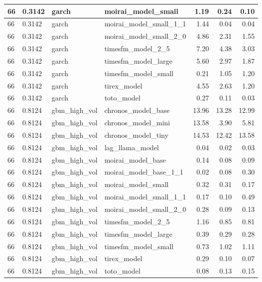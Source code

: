 {\begin{tabular}{llllrrr}
\midrule
66 & 0.3142 & garch & moirai\_model\_small & 1.19 & 0.24 & 0.10 \\
\midrule
66 & 0.3142 & garch & moirai\_model\_small\_1\_1 & 1.44 & 0.04 & 0.04 \\
\midrule
66 & 0.3142 & garch & moirai\_model\_small\_2\_0 & 4.86 & 2.31 & 1.55 \\
\midrule
66 & 0.3142 & garch & timesfm\_model\_2\_5 & 7.20 & 4.38 & 3.03 \\
\midrule
66 & 0.3142 & garch & timesfm\_model\_large & 5.60 & 2.97 & 1.87 \\
\midrule
66 & 0.3142 & garch & timesfm\_model\_small & 0.21 & 1.05 & 1.20 \\
\midrule
66 & 0.3142 & garch & tirex\_model & 4.55 & 2.63 & 1.20 \\
\midrule
66 & 0.3142 & garch & toto\_model & 0.27 & 0.11 & 0.03 \\
\midrule
66 & 0.8124 & gbm\_high\_vol & chronos\_model\_base & 13.96 & 13.28 & 12.99 \\
\midrule
66 & 0.8124 & gbm\_high\_vol & chronos\_model\_mini & 13.58 & 3.90 & 5.81 \\
\midrule
66 & 0.8124 & gbm\_high\_vol & chronos\_model\_tiny & 14.53 & 12.42 & 13.58 \\
\midrule
66 & 0.8124 & gbm\_high\_vol & lag\_llama\_model & 0.04 & 0.02 & 0.03 \\
\midrule
66 & 0.8124 & gbm\_high\_vol & moirai\_model\_base & 0.14 & 0.08 & 0.09 \\
\midrule
66 & 0.8124 & gbm\_high\_vol & moirai\_model\_base\_1\_1 & 0.02 & 0.08 & 0.30 \\
\midrule
66 & 0.8124 & gbm\_high\_vol & moirai\_model\_small & 0.32 & 0.31 & 0.17 \\
\midrule
66 & 0.8124 & gbm\_high\_vol & moirai\_model\_small\_1\_1 & 0.17 & 0.10 & 0.49 \\
\midrule
66 & 0.8124 & gbm\_high\_vol & moirai\_model\_small\_2\_0 & 0.28 & 0.09 & 0.13 \\
\midrule
66 & 0.8124 & gbm\_high\_vol & timesfm\_model\_2\_5 & 1.16 & 0.85 & 0.81 \\
\midrule
66 & 0.8124 & gbm\_high\_vol & timesfm\_model\_large & 0.39 & 0.29 & 0.28 \\
\midrule
66 & 0.8124 & gbm\_high\_vol & timesfm\_model\_small & 0.73 & 1.02 & 1.11 \\
\midrule
66 & 0.8124 & gbm\_high\_vol & tirex\_model & 0.29 & 0.10 & 0.07 \\
\midrule
66 & 0.8124 & gbm\_high\_vol & toto\_model & 0.08 & 0.13 & 0.15 \\
\bottomrule
\end{tabular}
}